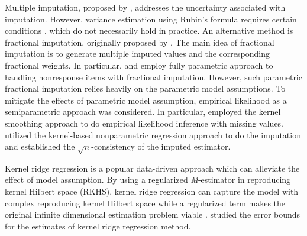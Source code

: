 \documentclass[12pt]{article}
\begin{document}
Multiple imputation,  proposed by \citet{rubin2004multiple}, addresses the uncertainty associated with imputation.  
However,  variance estimation using Rubin's formula  requires  certain conditions \citep{wang1998large,kim2006bias,yang2016note}, which do not necessarily hold in practice. An alternative method  is fractional imputation, originally proposed by \citet{kalton1984some}. The main idea of fractional imputation is to generate multiple imputed values and the corresponding fractional weights. 
In particular,
\citet{kim2011parametric} and \citet{kim2014fractional} employ fully parametric approach to handling nonresponse items with fractional imputation. However, such parametric fractional imputation relies heavily on the parametric model assumptions.  To mitigate the effects of parametric model assumption, empirical likelihood \citep{owen2001empirical,qin1994empirical} as a semiparametric approach was considered. In particular,  \citet{wang2009empirical} employed the kernel smoothing approach to do empirical likelihood inference with missing values. %
\citet{cheng1994nonparametric} utilized the kernel-based nonparametric regression approach to do the imputation and established the $\sqrt{n}$-consistency of the imputed estimator.

Kernel ridge regression \citep{friedman2001elements,shawe2004kernel} is a popular data-driven approach which can alleviate the effect of model assumption. {By using} a regularized \textit{M}-estimator {in reproducing} kernel Hilbert space (RKHS), kernel ridge regression can capture the model with {complex reproducing kernel Hilbert space} while a regularized term makes the original infinite dimensional estimation problem viable \citep{wahba1990spline}. \citet{geer2000empirical,mendelson2002geometric,zhang2005learning,koltchinskii2006local,steinwart2009optimal} studied the error bounds for the estimates of kernel ridge regression method. 
\end{document}
